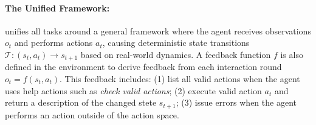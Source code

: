 \paragraph{The Unified Framework:} 
\BenchName{} unifies all tasks around a general framework where the agent receives observations $o_t$ and performs actions $a_t$, causing deterministic state transitions $\mathcal{T}: (s_{t}, a_t) \rightarrow s_{t+1}$ based on real-world dynamics. A feedback function $f$ is also defined in the environment to derive feedback from each interaction round $o_t = f(s_t, a_t)$. This feedback includes: (1) list all valid actions when the agent uses help actions such as \textit{check valid actions}; (2) execute valid action $a_t$ and return a description of the changed stete $s_{t+1}$; (3) issue errors when the agent performs an action outside of the action space. 



